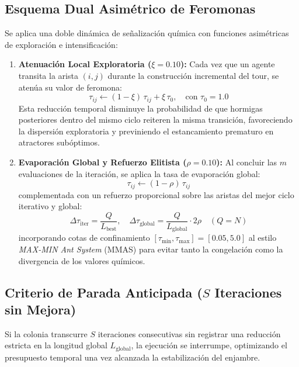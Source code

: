 \documentclass[11pt,a4paper]{article}
\begin{document}
\subsection{Esquema Dual Asimétrico de Feromonas}
Se aplica una doble dinámica de señalización química con funciones asimétricas de exploración e intensificación:
\begin{enumerate}
    \item \textbf{Atenuación Local Exploratoria ($\xi = 0.10$):} Cada vez que un agente transita la arista $(i, j)$ durante la construcción incremental del tour, se atenúa su valor de feromona:
    \begin{equation}
        \tau_{ij} \leftarrow (1 - \xi)\,\tau_{ij} + \xi\,\tau_0, \quad \text{con } \tau_0 = 1.0
    \end{equation}
    Esta reducción temporal disminuye la probabilidad de que hormigas posteriores dentro del mismo ciclo reiteren la misma transición, favoreciendo la dispersión exploratoria y previniendo el estancamiento prematuro en atractores subóptimos.
    \item \textbf{Evaporación Global y Refuerzo Elitista ($\rho = 0.10$):} Al concluir las $m$ evaluaciones de la iteración, se aplica la tasa de evaporación global:
    \begin{equation}
        \tau_{ij} \leftarrow (1 - \rho)\,\tau_{ij}
    \end{equation}
    complementada con un refuerzo proporcional sobre las aristas del mejor ciclo iterativo y global:
    \begin{equation}
        \Delta \tau_{\text{iter}} = \frac{Q}{L_{\text{best}}}, \quad \Delta \tau_{\text{global}} = \frac{Q}{L_{\text{global}}} \cdot 2\rho \quad (Q = N)
    \end{equation}
    incorporando cotas de confinamiento $[\tau_{\min}, \tau_{\max}] = [0.05, 5.0]$ al estilo \emph{MAX-MIN Ant System} (MMAS) para evitar tanto la congelación como la divergencia de los valores químicos.
\end{enumerate}

\subsection{Criterio de Parada Anticipada (\texorpdfstring{$S$}{S} Iteraciones sin Mejora)}
Si la colonia transcurre $S$ iteraciones consecutivas sin registrar una reducción estricta en la longitud global $L_{\text{global}}$, la ejecución se interrumpe, optimizando el presupuesto temporal una vez alcanzada la estabilización del enjambre.
\end{document}
